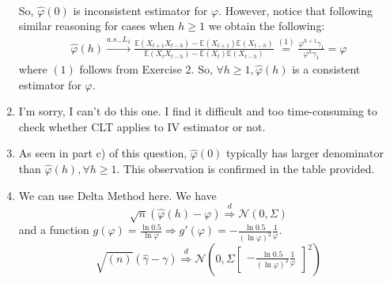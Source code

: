 \documentclass[]{article}
\begin{document}
\begin{enumerate}[label=\alph*)]
\begin{equation}
\begin{split}
		\end{split}
	\end{equation}
	So, $\hat{\varphi}(0)$ is inconsistent estimator for $\varphi$. However, notice that following similar reasoning for cases when $h\geq1$ we obtain the following:
	\begin{equation}
		\begin{split}
		\hat{\varphi}(h)\overset{a.s., L_1}{\longrightarrow}\frac{\mathbb{E}(X_{t+1}X_{t-h}) - \mathbb{E}(X_{t+1})\mathbb{E}(X_{t-h})}{\mathbb{E}(X_tX_{t-h}) - \mathbb{E}(X_t)\mathbb{E}(X_{t-h})} \overset{(1)}{=} \frac{\varphi^{h+1}\gamma_1}{\varphi^{h}\gamma_1} = \varphi \nonumber
		\end{split}
	\end{equation}
	where $(1)$ follows from Exercise 2. So, $\forall h\geq1, \hat{\varphi}(h)$ is a consistent estimator for $\varphi$.
	\item I'm sorry, I can't do this one. I find it difficult and too time-consuming to check whether CLT applies to IV estimator or not.
	
	\item As seen in part c) of this question, $\hat{\varphi}(0)$ typically has larger denominator than $\hat{\varphi}(h), \forall h\geq1$. This observation is confirmed in the table provided.
	
	\item We can use Delta Method here. We have
	\begin{equation}
		\sqrt{n}(\hat{\varphi}(h) - \varphi) \overset{d}{\Longrightarrow} \mathcal{N}(0, \Sigma) \nonumber
	\end{equation}
	and a function $g(\varphi) = \frac{\ln0.5}{\ln\varphi} \Longrightarrow g'(\varphi) = -\frac{\ln0.5}{(\ln\varphi)^2}\frac{1}{\varphi}$.
	\begin{equation}
		\sqrt{(n)}(\hat{\gamma} - \gamma)\overset{d}{\Longrightarrow}\mathcal{N}(0, \Sigma\begin{bmatrix}
			-\frac{\ln0.5}{(\ln\varphi)^2}\frac{1}{\varphi}
			\end{bmatrix}^2) \nonumber
	\end{equation}
\end{enumerate}

\pagebreak
\end{document}
